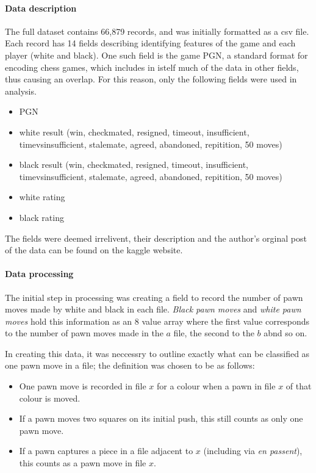 \documentclass[11pt,a4paper]{article}
\begin{document}
\paragraph{Data description} The full dataset contains 66,879 records, and was initially formatted as a csv file. 
Each record has 14 fields describing identifying features of the game and each player (white and black). One such field is the game PGN, a standard format for encoding chess games, which includes in istelf much of the data in other fields, thus causing an overlap. For this reason, only the following fields were used in analysis. 
\begin{itemize}
  \item PGN
  \item white result (win, checkmated, resigned, timeout, insufficient, timevsinsufficient, stalemate, agreed, abandoned, repitition, 50 moves)
  \item black result (win, checkmated, resigned, timeout, insufficient, timevsinsufficient, stalemate, agreed, abandoned, repitition, 50 moves)
  \item white rating
  \item black rating
\end{itemize}
The fields were deemed irrelivent, their description and the author's orginal post of the data can be found on the kaggle website.


\paragraph{Data processing} The initial step in processing was creating a field to record the number of pawn moves made by white and black in each file. 
\textit{Black pawn moves} and \textit{white pawn moves} hold this information as an 8 value array where the first value corresponds to the number of pawn moves made in the $a$ file, the second to the $b$ abnd so on. 

In creating this data, it was neccessry to outline exactly what can be classified as one pawn move in a file; the 
definition was chosen to be as follows:

\begin{itemize}
  \item One pawn move is recorded in file $x$ for a colour when a pawn in file $x$ of that colour is moved.
  \item If a pawn moves two squares on its initial push, this still counts as only one pawn move.
  \item If a pawn captures a piece in a file adjacent to $x$ (including via \textit{en passent}), this counts as a pawn move in file $x$.
\end{itemize}
 
\end{document}
